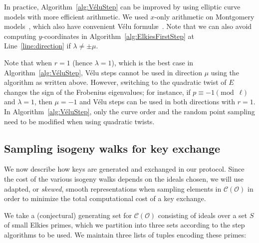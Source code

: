 \documentclass{llncs}
\newcommand{\Cl}{\mathcal{C}}
\renewcommand{\O}{\mathcal{O}}
\begin{document}
In practice, Algorithm~\ref{alg:VéluStep} can be improved
by using elliptic curve models with more efficient arithmetic.
We used $x$-only arithmetic on Montgomery models~\cite{Montgomery87,CostelloSmith2017},
which also have convenient Vélu formul\ae~\cite{Renes2018}.
Note that we can also avoid computing $y$-coordinates in
Algorithm~\ref{alg:ElkiesFirstStep}
at Line~\ref{line:direction} if $\lambda\neq\pm\mu$.

\begin{remark}
    \label{rem:twist-trick}
    Note that when $r = 1$ (hence $\lambda = 1$), which is the best case
    in Algorithm~\ref{alg:VéluStep}, Vélu steps cannot be used in direction $\mu$
    using the algorithm as written above. However, switching to the quadratic
    twist of $E$ changes the sign of the Frobenius eigenvalues; 
    for instance, if $p \equiv -1\pmod{\ell}$ and $\lambda = 1$, then $\mu=-1$ and
    Vélu steps can be used in both directions with $r=1$.
    In Algorithm~\ref{alg:VéluStep}, only the curve order
    and the random point sampling need to be modified when using quadratic twists.
\end{remark}

\subsection{Sampling isogeny walks for key exchange}

We now describe how keys are generated and exchanged in our protocol. 
Since the cost of the various isogeny walks depends on the ideals
chosen,
we will use adapted, or \emph{skewed}, 
smooth representations when sampling elements in $\Cl(\O)$
in order to minimize the total computational cost of a key exchange.

We take a (conjectural) generating set for $\Cl(\O)$ consisting of ideals over a set 
$S$ of small Elkies primes,
which we partition into three sets according to the step algorithms to be used.
We maintain three lists of tuples encoding these primes:
\end{document}
